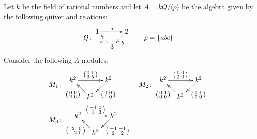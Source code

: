 \documentclass[a4paper]{amsart}
\begin{document}
\begin{Exercise}[title={Isomorphisms}]
Let $k$ be the field of rational numbers and let $A =
kQ/\langle\rho\rangle$ be the algebra given by the following quiver
and relations:
\[
Q\colon
\vcenter{\xymatrix@C=1em@R=1em{
1 \ar[rr]^a &&
2 \ar[dl]^b \\
& 3 \ar[ul]^c
}}
\qquad
\rho = \{ abc \}
\]
Consider the following $A$-modules.
\begin{align*}
M_1&\colon
\vcenter{\xymatrix@C=1em@R=1em{
k^2 \ar[rr]^{\left( \begin{smallmatrix} 0 & 1 \\ 3 & 5 \end{smallmatrix} \right)} &&
k^2 \ar[dl]^{\left( \begin{smallmatrix} 0 & 0 \\ 1 & 0 \end{smallmatrix} \right)} \\
&
k^2 \ar[ul]^{\left( \begin{smallmatrix} 0 & 0 \\ 2 & 0 \end{smallmatrix} \right)}
}}
&
M_2&\colon
\vcenter{\xymatrix@C=1em@R=1em{
k^2 \ar[rr]^{\left( \begin{smallmatrix} 0 & 0 \\ 2 & 0 \end{smallmatrix} \right)} &&
k^2 \ar[dl]^{\left( \begin{smallmatrix} 0 & 1 \\ 0 & 0 \end{smallmatrix} \right)} \\
&
k^2 \ar[ul]^{\left( \begin{smallmatrix} 0 & 1 \\ 0 & 0 \end{smallmatrix} \right)}
}}
\\
M_3&\colon
\vcenter{\xymatrix@C=1em@R=1em{
k^2 \ar[rr]^{\left( \begin{smallmatrix} -1 &  0 \\ 1 & 3 \end{smallmatrix} \right)} &&
k^2 \ar[dl]^{\left( \begin{smallmatrix} -1 & -1 \\ 2 & 2 \end{smallmatrix} \right)} \\
&
k^2 \ar[ul]^{\left( \begin{smallmatrix} 2 & 0 \\ -2 & 0 \end{smallmatrix} \right)}
}}
\end{align*}
\end{Exercise}
\end{document}
